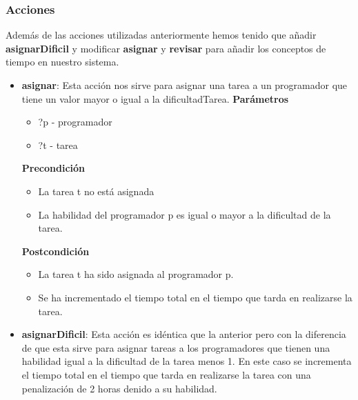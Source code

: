 \documentclass[11pt]{article}
\begin{document}
\subsubsection{Acciones}
Además de las acciones utilizadas anteriormente hemos tenido que añadir \textbf{asignarDificil} y modificar \textbf{asignar} y \textbf{revisar} para añadir los conceptos de tiempo en nuestro sistema.
\begin{itemize}
	\item \textbf{asignar}: Esta acción nos sirve para asignar una tarea a un programador que tiene un valor mayor o igual a la dificultadTarea. 
	\textbf{Parámetros}
	\begin{itemize}
		\item ?p - programador
		\item ?t - tarea
	\end{itemize}
	\textbf{Precondición}
	\begin{itemize}
		\item La tarea t no está asignada
		\item La habilidad del programador p es igual o mayor a la dificultad de la tarea. 
	\end{itemize}
	\textbf{Postcondición}
	\begin{itemize}	
		\item La tarea t ha sido asignada al programador p.
		\item Se ha incrementado el tiempo total en  el tiempo que tarda en realizarse la tarea.
	\end{itemize}

	\item \textbf{asignarDificil}: Esta acción es idéntica que la anterior pero con la diferencia de que esta sirve para asignar tareas a los programadores que tienen una habilidad igual a la dificultad de la tarea menos 1. En este caso se incrementa el tiempo total en el tiempo que tarda en realizarse la tarea con una penalización de 2 horas denido a su habilidad.


\end{itemize}
\end{document}
